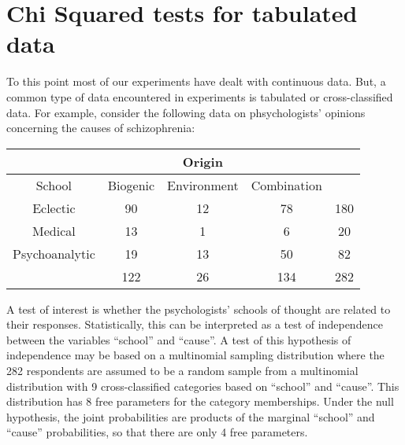 \documentclass[
]{book}
\begin{document}
\hypertarget{chi-squared-tests-for-tabulated-data}{%
\section{Chi Squared tests for tabulated data}\label{chi-squared-tests-for-tabulated-data}}

To this point most of our experiments have dealt with continuous data. But, a common type of data encountered in experiments is tabulated or cross-classified data. For example, consider the following data on phsychologists' opinions concerning the causes of schizophrenia:

\begin{longtable}[]{@{}ccccc@{}}
\toprule()
& & Origin & & \\
\midrule()
\endhead
School & Biogenic & Environment & Combination & \\
Eclectic & 90 & 12 & 78 & 180 \\
Medical & 13 & 1 & 6 & 20 \\
Psychoanalytic & 19 & 13 & 50 & 82 \\
& 122 & 26 & 134 & 282 \\
\bottomrule()
\end{longtable}

A test of interest is whether the psychologists' schools of thought are related to their responses. Statistically, this can be interpreted as a test of independence between the variables ``school'' and ``cause''. A test of this hypothesis of independence may be based on a multinomial sampling distribution where the 282 respondents are assumed to be a random sample from a multinomial distribution with 9 cross-classified categories based on ``school'' and ``cause''. This distribution has 8 free parameters for the category memberships. Under the null hypothesis, the joint probabilities are products of the marginal ``school'' and ``cause'' probabilities, so that there are only 4 free parameters.
\end{document}
